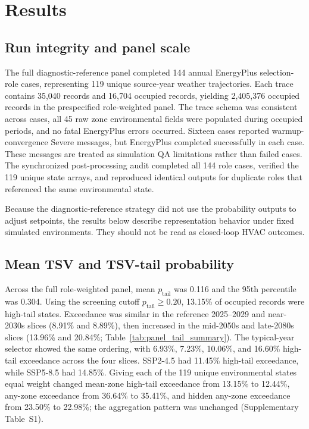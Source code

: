 \section{Results}\label{results}

\subsection{Run integrity and panel scale}

The full diagnostic-reference panel completed 144 annual EnergyPlus selection-role cases, representing 119 unique source-year weather trajectories. Each trace contains 35{,}040 records and 16{,}704 occupied records, yielding 2{,}405{,}376 occupied records in the prespecified role-weighted panel. The trace schema was consistent across cases, all 45 raw zone environmental fields were populated during occupied periods, and no fatal EnergyPlus errors occurred. Sixteen cases reported warmup-convergence Severe messages, but EnergyPlus completed successfully in each case. These messages are treated as simulation QA limitations rather than failed cases. The synchronized post-processing audit completed all 144 role cases, verified the 119 unique state arrays, and reproduced identical outputs for duplicate roles that referenced the same environmental state.

Because the diagnostic-reference strategy did not use the probability outputs to adjust setpoints, the results below describe representation behavior under fixed simulated environments. They should not be read as closed-loop HVAC outcomes.

\subsection{Mean TSV and TSV-tail probability}

Across the full role-weighted panel, mean $p_{\mathrm{tail}}$ was 0.116 and the 95th percentile was 0.304. Using the screening cutoff $p_{\mathrm{tail}}\ge0.20$, 13.15\% of occupied records were high-tail states. Exceedance was similar in the reference 2025--2029 and near-2030s slices (8.91\% and 8.89\%), then increased in the mid-2050s and late-2080s slices (13.96\% and 20.84\%; Table~\ref{tab:panel_tail_summary}). The typical-year selector showed the same ordering, with 6.93\%, 7.23\%, 10.06\%, and 16.60\% high-tail exceedance across the four slices. SSP2-4.5 had 11.45\% high-tail exceedance, while SSP5-8.5 had 14.85\%. Giving each of the 119 unique environmental states equal weight changed mean-zone high-tail exceedance from 13.15\% to 12.44\%, any-zone exceedance from 36.64\% to 35.41\%, and hidden any-zone exceedance from 23.50\% to 22.98\%; the aggregation pattern was unchanged (Supplementary Table~S1).

